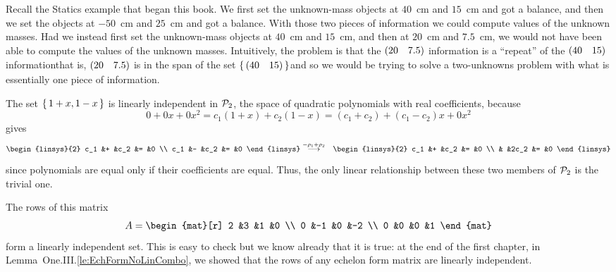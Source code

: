 \begin{example}  \label{ex:StaticsLIAndLD}
Recall the Statics example that began this book.
We first set the unknown-mass objects at \( 40 \)~cm and \( 15 \)~cm and
got a balance,
and then we set the objects at \( -50 \)~cm and \( 25 \)~cm and got a balance.
With those two pieces of information we could compute values of the unknown
masses.
Had we instead first set the unknown-mass objects at \( 40 \)~cm and 
\( 15 \)~cm, and then at
\( 20 \)~cm and \( 7.5 \)~cm, we would not have been able to compute the values
of the unknown masses.
Intuitively, 
the problem is that the \( (\begin{matrix} 20 &7.5 \end{matrix}) \) information is a ``repeat'' 
of the
$(\begin{matrix} 40 &15 \end{matrix})$ information\Dash that is, $(\begin{matrix} 20 &7.5 \end{matrix})$ is in the 
span of the set $\mbox{$\{\,(\begin{matrix} 40 &15 \end{matrix})\,\}$}$\Dash and so we would be trying to 
solve a two-unknowns problem with what is essentially one piece of information.
\end{example}

\begin{example}
The set \( \mbox{$\{\,1+x,1-x\,\}$} \) is linearly independent in \( \mathcal{P}_2 \), the
space of quadratic polynomials with real coefficients, because
\begin{equation*}
   0+0x+0x^2
   =
   c_1(1+x)+c_2(1-x)
   =
   (c_1+c_2)+(c_1-c_2)x+0x^2
\end{equation*}
gives 
\begin{eqnarray*}
  \begin{linsys}{2}
    c_1  &+  &c_2  &=  &0  \\
    c_1  &-  &c_2  &=  &0  
   \end{linsys}
  &\grstep{-\rho_1+\rho_2}
  &\begin{linsys}{2}
     c_1  &+  &c_2  &=  &0  \\
          &   &2c_2 &=  &0
  \end{linsys}
\end{eqnarray*}
since polynomials are equal only if their coefficients are equal.
Thus, the only linear relationship between these two members of
$\mathcal{P}_2$ is the trivial one.
\end{example}

\begin{example}
The rows of this matrix
\begin{equation*}
  A=
  \begin{mat}[r]
    2  &3  &1  &0  \\
    0  &-1 &0  &-2 \\
    0  &0  &0  &1
  \end{mat}
\end{equation*}
form a linearly independent set.
This is easy to check but we know already that it is true:
at the end of the first chapter, in Lemma~One.III.\ref{le:EchFormNoLinCombo},
we showed that the rows of any echelon form matrix are linearly independent.
\end{example}

